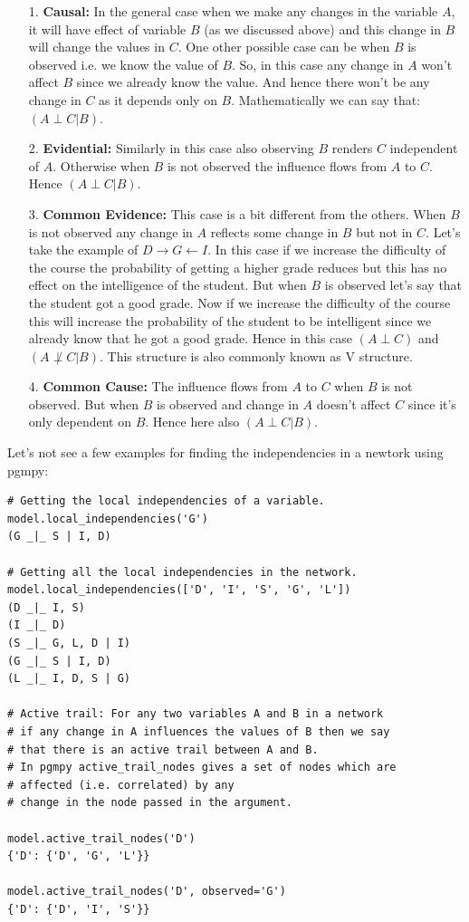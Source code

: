 \documentclass{article}
\begin{document}
\begin{itemize}
\item[1.] \textbf{Causal:} In the general case when we make any changes in the variable $ A $, it will have effect of variable $ B $ (as we discussed above) and this change in $ B $ will change the values in $ C $. One other possible case can be when $ B $ is observed i.e. we know the value of $ B $. So, in this case any change in $ A $ won’t affect $ B $ since we already know the value. And hence there won’t be any change in $ C $ as it depends only on $ B $. Mathematically we can say that: $ (A \perp C | B) $.

\item[2.] \textbf{Evidential:} Similarly in this case also observing $ B $ renders $ C $ independent of $ A $. Otherwise when $ B $ is not observed the influence flows from $ A $ to $ C $. Hence $ (A \perp C | B) $.

\item[3.] \textbf{Common Evidence:} This case is a bit different from the others. When $ B $ is not observed any change in $ A $ reflects some change in $ B $ but not in $ C $. Let’s take the example of $ D \rightarrow G \leftarrow I $. In this case if we increase the difficulty of the course the probability of getting a higher grade reduces but this has no effect on the intelligence of the student. But when $ B $ is observed let’s say that the student got a good grade. Now if we increase the difficulty of the course this will increase the probability of the student to be intelligent since we already know that he got a good grade. Hence in this case $ (A \perp C) $ and $ ( A \not \perp C | B) $. This structure is also commonly known as V structure.

\item[4.] \textbf{Common Cause:} The influence flows from $ A $ to $ C $ when $ B $ is not observed. But when $ B $ is observed and change in $ A $ doesn't affect $ C $ since it’s only dependent on $ B $. Hence here also $ ( A  \perp C | B) $.
\end{itemize}

Let's not see a few examples for finding the independencies in a newtork using pgmpy:

\begin{verbatim}
# Getting the local independencies of a variable.
model.local_independencies('G')
(G _|_ S | I, D)

# Getting all the local independencies in the network.
model.local_independencies(['D', 'I', 'S', 'G', 'L'])
(D _|_ I, S)
(I _|_ D)
(S _|_ G, L, D | I)
(G _|_ S | I, D)
(L _|_ I, D, S | G)

# Active trail: For any two variables A and B in a network 
# if any change in A influences the values of B then we say 
# that there is an active trail between A and B.
# In pgmpy active_trail_nodes gives a set of nodes which are 
# affected (i.e. correlated) by any
# change in the node passed in the argument.

model.active_trail_nodes('D')
{'D': {'D', 'G', 'L'}}

model.active_trail_nodes('D', observed='G')
{'D': {'D', 'I', 'S'}}
\end{verbatim}
\end{document}
